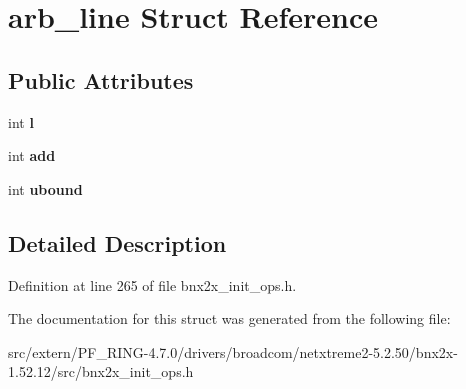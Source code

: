 \hypertarget{structarb__line}{
\section{arb\_\-line Struct Reference}
\label{structarb__line}
}
\subsection*{Public Attributes}
\begin{DoxyCompactItemize}
\item 
\hypertarget{structarb__line_a01a71364388446fb223cec1363854522}{
int {\bfseries l}}
\label{structarb__line_a01a71364388446fb223cec1363854522}

\item 
\hypertarget{structarb__line_a42ac0813a9f6324d284c5fdb2d923708}{
int {\bfseries add}}
\label{structarb__line_a42ac0813a9f6324d284c5fdb2d923708}

\item 
\hypertarget{structarb__line_add0674cba06496e3926997f4dac31df6}{
int {\bfseries ubound}}
\label{structarb__line_add0674cba06496e3926997f4dac31df6}

\end{DoxyCompactItemize}


\subsection{Detailed Description}


Definition at line 265 of file bnx2x\_\-init\_\-ops.h.



The documentation for this struct was generated from the following file:\begin{DoxyCompactItemize}
\item 
src/extern/PF\_\-RING-\/4.7.0/drivers/broadcom/netxtreme2-\/5.2.50/bnx2x-\/1.52.12/src/bnx2x\_\-init\_\-ops.h\end{DoxyCompactItemize}
